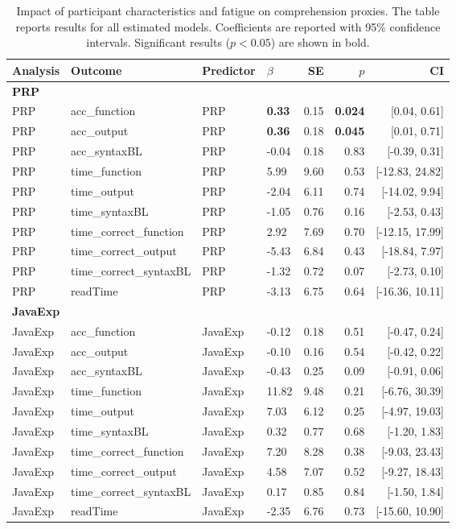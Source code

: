 \begin{table}[t]
\scriptsize
\centering
\caption{Impact of participant characteristics and fatigue on comprehension proxies. The table reports results for all estimated models. Coefficients are reported with 95\% confidence intervals. Significant results ($p < 0.05$) are shown in bold.}
\label{tab:student_factors_final}
\begin{tabular}{llllrrr}
\toprule
Analysis & Outcome & Predictor & $\beta$ & SE & $p$ & CI \\
\midrule

\multicolumn{7}{l}{\textbf{PRP}} \\
PRP & acc\_function & PRP & \textbf{0.33} & 0.15 & \textbf{0.024} & [0.04, 0.61] \\
PRP & acc\_output & PRP & \textbf{0.36} & 0.18 & \textbf{0.045} & [0.01, 0.71] \\
PRP & acc\_syntaxBL & PRP & -0.04 & 0.18 & 0.83 & [-0.39, 0.31] \\
PRP & time\_function & PRP & 5.99 & 9.60 & 0.53 & [-12.83, 24.82] \\
PRP & time\_output & PRP & -2.04 & 6.11 & 0.74 & [-14.02, 9.94] \\
PRP & time\_syntaxBL & PRP & -1.05 & 0.76 & 0.16 & [-2.53, 0.43] \\
PRP & time\_correct\_function & PRP & 2.92 & 7.69 & 0.70 & [-12.15, 17.99] \\
PRP & time\_correct\_output & PRP & -5.43 & 6.84 & 0.43 & [-18.84, 7.97] \\
PRP & time\_correct\_syntaxBL & PRP & -1.32 & 0.72 & 0.07 & [-2.73, 0.10] \\
PRP & readTime & PRP & -3.13 & 6.75 & 0.64 & [-16.36, 10.11] \\

\midrule

\multicolumn{7}{l}{\textbf{JavaExp}} \\
JavaExp & acc\_function & JavaExp & -0.12 & 0.18 & 0.51 & [-0.47, 0.24] \\
JavaExp & acc\_output & JavaExp & -0.10 & 0.16 & 0.54 & [-0.42, 0.22] \\
JavaExp & acc\_syntaxBL & JavaExp & -0.43 & 0.25 & 0.09 & [-0.91, 0.06] \\
JavaExp & time\_function & JavaExp & 11.82 & 9.48 & 0.21 & [-6.76, 30.39] \\
JavaExp & time\_output & JavaExp & 7.03 & 6.12 & 0.25 & [-4.97, 19.03] \\
JavaExp & time\_syntaxBL & JavaExp & 0.32 & 0.77 & 0.68 & [-1.20, 1.83] \\
JavaExp & time\_correct\_function & JavaExp & 7.20 & 8.28 & 0.38 & [-9.03, 23.43] \\
JavaExp & time\_correct\_output & JavaExp & 4.58 & 7.07 & 0.52 & [-9.27, 18.43] \\
JavaExp & time\_correct\_syntaxBL & JavaExp & 0.17 & 0.85 & 0.84 & [-1.50, 1.84] \\
JavaExp & readTime & JavaExp & -2.35 & 6.76 & 0.73 & [-15.60, 10.90] \\


\end{tabular}
\end{table}
